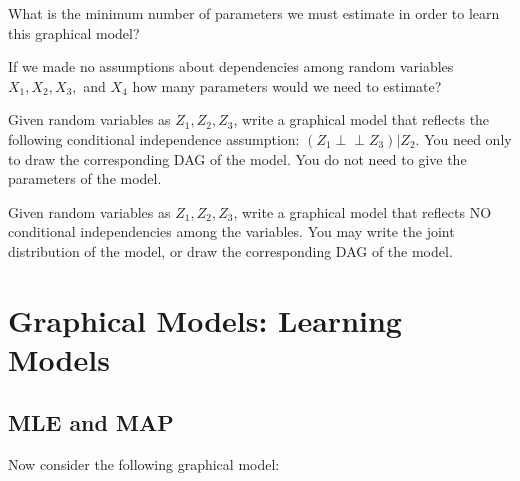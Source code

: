 \documentclass[11pt,addpoints,answers]{exam}
\newcommand{\independent}{\perp\!\!\!\perp  }
\begin{document}
\begin{questions}
\begin{questions}
 
 \question[2]  What is the minimum number of parameters we must estimate in order to learn this graphical model?

\begin{your_solution}[title=Your Answer:,height=3cm,width=10cm]
\end{your_solution}

    
 
 \question[2]  If we made no assumptions about dependencies among random variables $X_1, X_2, X_3,$ and $X_4$ how many parameters would we need to estimate?

\begin{your_solution}[title=Your Answer:,height=3cm,width=10cm]
\end{your_solution}

 
 
 \question[2] Given random variables as $Z_1, Z_2, Z_3$, write a graphical model that reflects the following conditional independence assumption: $(Z_1 \independent Z_3)| Z_2$. You need only to draw the corresponding DAG of the model. You do not need to give the parameters of the model.
 
 \begin{your_solution}[title=Your Answer:,height=5cm,width=15cm]
\end{your_solution}

\clearpage
 
 \question[2] Given random variables as $Z_1, Z_2, Z_3$, write a graphical model that reflects NO conditional independencies among the variables. You may write the joint distribution of the model, or draw the corresponding DAG of the model.


 \begin{your_solution}[title=Your Answer:,height=5cm,width=15cm]
\end{your_solution}
 

\end{questions}


\clearpage


\section{Graphical Models: Learning Models}

\subsection{MLE and MAP}
Now consider the following graphical model:




\end{questions}
\end{document}
